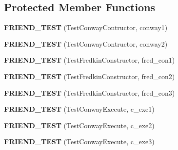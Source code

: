 \subsection*{Protected Member Functions}
\begin{DoxyCompactItemize}
\item 
\hypertarget{classAbstractCell_a9b400ff7731b2e3ede3a5a8a0c996a71}{{\bfseries F\-R\-I\-E\-N\-D\-\_\-\-T\-E\-S\-T} (Test\-Conway\-Contructor, conway1)}\label{classAbstractCell_a9b400ff7731b2e3ede3a5a8a0c996a71}

\item 
\hypertarget{classAbstractCell_a04c6d93c588a88ed67f8d7c94f375fe4}{{\bfseries F\-R\-I\-E\-N\-D\-\_\-\-T\-E\-S\-T} (Test\-Conway\-Contructor, conway2)}\label{classAbstractCell_a04c6d93c588a88ed67f8d7c94f375fe4}

\item 
\hypertarget{classAbstractCell_ae68e489f10b9223ced4f3bcad07ee4aa}{{\bfseries F\-R\-I\-E\-N\-D\-\_\-\-T\-E\-S\-T} (Test\-Fredkin\-Constructor, fred\-\_\-con1)}\label{classAbstractCell_ae68e489f10b9223ced4f3bcad07ee4aa}

\item 
\hypertarget{classAbstractCell_afd842743b9c9be674ff449acba1e1001}{{\bfseries F\-R\-I\-E\-N\-D\-\_\-\-T\-E\-S\-T} (Test\-Fredkin\-Constructor, fred\-\_\-con2)}\label{classAbstractCell_afd842743b9c9be674ff449acba1e1001}

\item 
\hypertarget{classAbstractCell_a8cda68b3384c84b181a1d575bfceb1df}{{\bfseries F\-R\-I\-E\-N\-D\-\_\-\-T\-E\-S\-T} (Test\-Fredkin\-Constructor, fred\-\_\-con3)}\label{classAbstractCell_a8cda68b3384c84b181a1d575bfceb1df}

\item 
\hypertarget{classAbstractCell_ae310a1a99ce0c001e73563d3615a73cf}{{\bfseries F\-R\-I\-E\-N\-D\-\_\-\-T\-E\-S\-T} (Test\-Conway\-Execute, c\-\_\-exe1)}\label{classAbstractCell_ae310a1a99ce0c001e73563d3615a73cf}

\item 
\hypertarget{classAbstractCell_abc78683e4bfbc60f28f8ac0b0d85de74}{{\bfseries F\-R\-I\-E\-N\-D\-\_\-\-T\-E\-S\-T} (Test\-Conway\-Execute, c\-\_\-exe2)}\label{classAbstractCell_abc78683e4bfbc60f28f8ac0b0d85de74}

\item 
\hypertarget{classAbstractCell_aa5c793e060395b153bcbcc0f7d496114}{{\bfseries F\-R\-I\-E\-N\-D\-\_\-\-T\-E\-S\-T} (Test\-Conway\-Execute, c\-\_\-exe3)}\label{classAbstractCell_aa5c793e060395b153bcbcc0f7d496114}


\end{DoxyCompactItemize}
